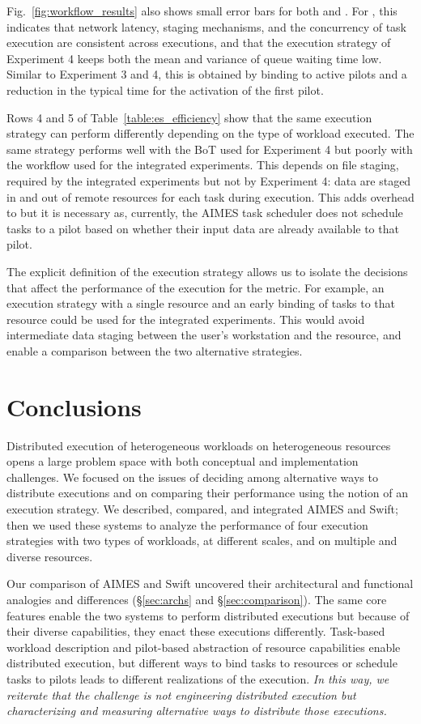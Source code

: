 \documentclass[10pt, conference, compsocconf]{IEEEtran}
\begin{document}
Fig.~\ref{fig:workflow_results} also shows small error bars for both 
and . For , this indicates that network latency, staging
mechanisms, and the concurrency of task execution are consistent across
executions, and that the execution strategy of Experiment 4 keeps both the
mean and variance of queue waiting time low. Similar to Experiment 3 and 4,
this is obtained by binding to active pilots and a reduction in the typical
time for the activation of the first pilot.

Rows 4 and 5 of Table~\ref{table:es_efficiency} show that the same execution
strategy can perform differently depending on the type of workload executed.
The same strategy performs well with the BoT used for Experiment 4 but poorly
with the workflow used for the integrated experiments. This depends on file
staging, required by the integrated experiments but not by Experiment 4: data
are staged in and out of remote resources for each task during execution.
This adds overhead to  but it is necessary as, currently, the AIMES
task scheduler does not schedule tasks to a pilot based on whether their
input data are already available to that pilot.

The explicit definition of the execution strategy allows us to isolate the
decisions that affect the performance of the execution for the 
metric. For example, an execution strategy with a single resource and an
early binding of tasks to that resource could be used for the integrated
experiments. This would avoid intermediate data staging between the user's
workstation and the resource, and enable a comparison between the two
alternative strategies.


\section{Conclusions}\label{sec:discussions}

Distributed execution of heterogeneous workloads on heterogeneous resources
opens a large problem space with both conceptual and implementation
challenges. We focused on the issues of deciding among alternative ways to
distribute executions and on comparing their performance using the notion of
an execution strategy. We described, compared, and integrated AIMES and
Swift; then we used these systems to analyze the performance of four
execution strategies with two types of workloads, at different scales, and on
multiple and diverse resources.

Our comparison of AIMES and Swift uncovered their architectural and
functional analogies and differences (\S\ref{sec:archs} and
\S\ref{sec:comparison}). The same core features enable the two systems to
perform distributed executions but because of their diverse capabilities,
they enact these executions differently. Task-based workload description and
pilot-based abstraction of resource capabilities enable distributed
execution, but different ways to bind tasks to resources or schedule tasks to
pilots leads to different realizations of the execution.  {\it In this way,
we reiterate that the challenge is not engineering distributed execution but
characterizing and measuring alternative ways to distribute those
executions.}
\end{document}
